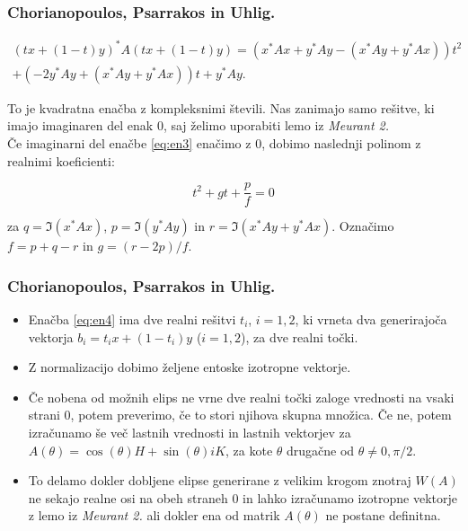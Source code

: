\documentclass{beamer}
\begin{document}
\begin{frame}
\frametitle{Chorianopoulos, Psarrakos in Uhlig.}
\begin{block}{}
\begin{multline}\label{eq:en3}
(tx +(1-t)y)^\ast A(tx+(1-t)y)=(x^\ast Ax+y^\ast Ay -(x^\ast Ay +y^\ast Ax))t^2 \\
+(-2y^\ast Ay +(x^\ast Ay+y^\ast Ax))t +y^\ast Ay.
\end{multline}
\end{block}
To je kvadratna enačba z kompleksnimi števili. Nas zanimajo samo rešitve, ki imajo imaginaren del enak 0, saj želimo uporabiti lemo iz \emph{Meurant 2.}\pause\\
Če imaginarni del enačbe \eqref{eq:en3} enačimo z 0, dobimo naslednji polinom z realnimi koeficienti:
\begin{block}{}
\begin{equation}
t^2+gt+\frac{p}{f}=0 \label{eq:en4}
\end{equation}
\end{block}
za $q=\Im(x^\ast Ax)$, $p=\Im(y^\ast Ay)$ in $r=\Im(x^\ast  Ay + y^\ast Ax)$. Označimo $f=p+q-r$ in $g=(r-2p)/f$.
\end{frame}
\begin{frame}
\frametitle{Chorianopoulos, Psarrakos in Uhlig.}
\begin{itemize}
 \item Enačba \eqref{eq:en4} ima dve realni rešitvi $t_i$, $i=1,2$, ki vrneta dva generirajoča vektorja $b_i=t_ix+(1-t_i)y$ ($i=1,2$), za dve realni točki. 
\item Z normalizacijo dobimo željene entoske izotropne vektorje. 
\item Če nobena od možnih elips ne vrne dve realni točki zaloge vrednosti na vsaki strani 0, potem preverimo, če to stori njihova skupna množica. Če ne, potem izračunamo še več lastnih vrednosti in lastnih vektorjev za $A(\theta)=\cos(\theta)H+\sin(\theta)iK$, za kote $\theta$ drugačne od $\theta \not =0,\pi/2$. 
\item To delamo dokler dobljene elipse generirane z velikim krogom znotraj $W(A)$ ne sekajo realne osi na obeh straneh 0 in lahko izračunamo izotropne vektorje z lemo iz \emph{Meurant 2.} ali dokler ena od matrik $A(\theta)$ ne postane definitna.
\end{itemize}
\end{frame}
\end{document}
